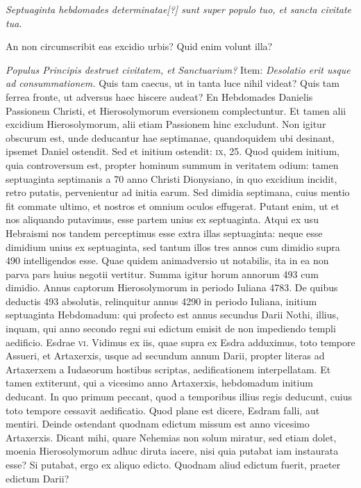 \begin{parnumbers}
\textit{Septuaginta hebdomades determinatae[?] sunt
super populo tuo, et sancta civitate tua.}

{}
\lnr{}An non circumscribit eas
excidio urbis?
\lnr{}Quid enim volunt illa?

\textit{Populus Principis destruet civitatem,
et Sanctuarium?}
\lnr{}Item: \textit{Desolatio erit usque ad consummationem.}
\lnr{}Quis tam caecus, ut in tanta luce nihil videat?
\lnr{}Quis tam ferrea fronte, ut adversus haec hiscere audeat?
\lnr{}En Hebdomades
Danielis Passionem Christi, et Hierosolymorum eversionem complectuntur.
\lnr{}Et tamen alii excidium Hierosolymorum, alii etiam
Passionem hinc excludunt.
\lnr{}Non igitur obscurum est, unde deducantur
hae septimanae, quandoquidem ubi desinant, ipsemet Daniel
ostendit.
\lnr{}Sed et initium ostendit: \textsc{ix}, 25.
\lnr{}Quod quidem initium,
quia controversum est, propter hominum summum in veritatem
odium: tamen septuaginta septimanis a 70 anno Christi
Dionysiano, in quo excidium incidit, retro putatis, pervenientur
ad initia earum.
\lnr{}Sed dimidia septimana, cuius mentio fit commate
ultimo, et nostros et omnium oculos effugerat.
\lnr{}Putant enim,
ut et nos aliquando putavimus, esse partem unius ex septuaginta.
\lnr{}Atqui ex usu Hebraismi nos tandem perceptimus esse extra illas septuaginta:
neque esse dimidium unius ex septuaginta, sed tantum
illos tres annos cum dimidio supra 490 intelligendos esse.
\lnr{}Quae
quidem animadversio ut notabilis, ita in ea non parva pars huius
negotii vertitur.
\lnr{}Summa igitur horum annorum 493 cum dimidio.
\lnr{}Annus captorum Hierosolymorum in periodo Iuliana 4783.
\lnr{}De quibus deductis 493 absolutis, relinquitur annus 4290 in periodo
Iuliana, initium septuaginta Hebdomadum: qui profecto
est annus secundus Darii Nothi, illius, inquam, qui anno secondo
regni sui edictum emisit de non impediendo templi aedificio.
\lnr{}Esdrae \textsc{vi}.
\lnr{}Vidimus ex iis, quae supra ex Esdra adduximus, toto tempore
Assueri, et Artaxerxis, usque ad secundum annum Darii, propter
literas ad Artaxerxem a Iudaeorum hostibus scriptas, aedificationem
interpellatam.
\lnr{}Et tamen extiterunt, qui a vicesimo anno
Artaxerxis, hebdomadum initium deducant.
\lnr{}In quo primum
peccant, quod a temporibus illius regis deducunt, cuius toto tempore
cessavit aedificatio.
\lnr{}Quod plane est dicere, Esdram falli, aut mentiri.
\lnr{}Deinde ostendant quodnam edictum missum est anno vicesimo
Artaxerxis.
\lnr{}Dicant mihi, quare Nehemias non solum miratur,
sed etiam dolet, moenia Hierosolymorum adhuc diruta iacere,
nisi quia putabat iam instaurata esse?
\lnr{}Si putabat, ergo ex
aliquo edicto.
\lnr{}Quodnam aliud edictum fuerit, praeter edictum
Darii?


\end{parnumbers}
